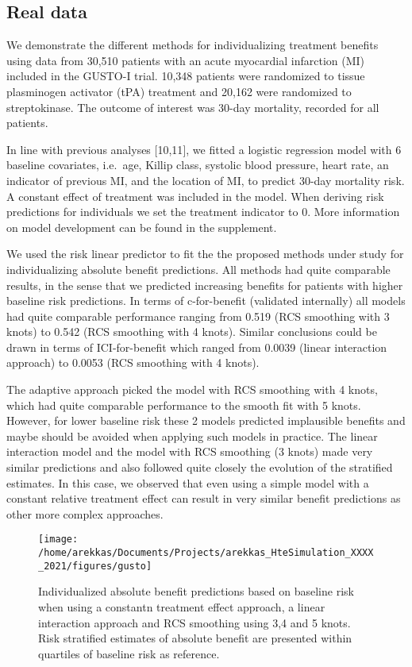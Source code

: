 \documentclass{article}
\begin{document}
\hypertarget{real-data}{%
\subsection{Real data}\label{real-data}}

We demonstrate the different methods for individualizing treatment
benefits using data from 30,510 patients with an acute myocardial
infarction (MI) included in the GUSTO-I trial. 10,348 patients were
randomized to tissue plasminogen activator (tPA) treatment and 20,162
were randomized to streptokinase. The outcome of interest was 30-day
mortality, recorded for all patients.

In line with previous analyses {[}10,11{]}, we fitted a logistic
regression model with 6 baseline covariates, i.e.~age, Killip class,
systolic blood pressure, heart rate, an indicator of previous MI, and
the location of MI, to predict 30-day mortality risk. A constant effect
of treatment was included in the model. When deriving risk predictions
for individuals we set the treatment indicator to 0. More information on
model development can be found in the supplement.

We used the risk linear predictor to fit the the proposed methods under
study for individualizing absolute benefit predictions. All methods had
quite comparable results, in the sense that we predicted increasing
benefits for patients with higher baseline risk predictions. In terms of
c-for-benefit (validated internally) all models had quite comparable
performance ranging from 0.519 (RCS smoothing with 3 knots) to 0.542
(RCS smoothing with 4 knots). Similar conclusions could be drawn in
terms of ICI-for-benefit which ranged from 0.0039 (linear interaction
approach) to 0.0053 (RCS smoothing with 4 knots).

The adaptive approach picked the model with RCS smoothing with 4 knots,
which had quite comparable performance to the smooth fit with 5 knots.
However, for lower baseline risk these 2 models predicted implausible
benefits and maybe should be avoided when applying such models in
practice. The linear interaction model and the model with RCS smoothing
(3 knots) made very similar predictions and also followed quite closely
the evolution of the stratified estimates. In this case, we observed
that even using a simple model with a constant relative treatment effect
can result in very similar benefit predictions as other more complex
approaches.

\begin{figure}
\texttt{[image: /home/arekkas/Documents/Projects/arekkas\_HteSimulation\_XXXX\_2021/figures/gusto]} \caption{Individualized absolute benefit predictions based on baseline risk when using a constantn treatment effect approach, a linear interaction approach and RCS smoothing using 3,4 and 5 knots. Risk stratified estimates of absolute benefit are presented within quartiles of baseline risk as reference.}\label{fig:gusto}
\end{figure}
\end{document}
